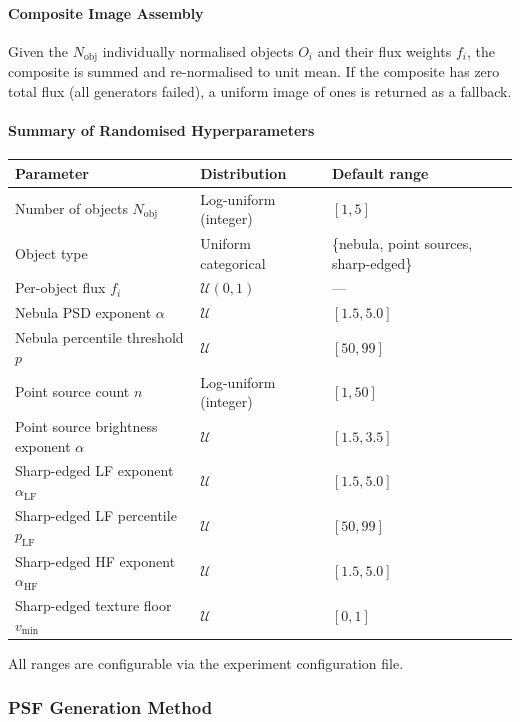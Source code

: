 \documentclass{aa}
\begin{document}
\paragraph{Composite Image Assembly}

Given the $N_\mathrm{obj}$ individually normalised objects $O_i$ and their flux weights $f_i$, the composite is summed and re-normalised to unit mean. If the composite has zero total flux (all generators failed), a uniform image of ones is returned as a fallback.

\paragraph{Summary of Randomised Hyperparameters}

\begin{table}[h]
\centering
\begin{tabular}{|l|l|l|}
\hline
\textbf{Parameter} & \textbf{Distribution} & \textbf{Default range} \\
\hline
Number of objects $N_\mathrm{obj}$ & Log-uniform (integer) & $[1, 5]$ \\
Object type & Uniform categorical & \{nebula, point sources, sharp-edged\} \\
Per-object flux $f_i$ & $\mathcal{U}(0,1)$ & --- \\
Nebula PSD exponent $\alpha$ & $\mathcal{U}$ & $[1.5, 5.0]$ \\
Nebula percentile threshold $p$ & $\mathcal{U}$ & $[50, 99]$ \\
Point source count $n$ & Log-uniform (integer) & $[1, 50]$ \\
Point source brightness exponent $\alpha$ & $\mathcal{U}$ & $[1.5, 3.5]$ \\
Sharp-edged LF exponent $\alpha_\mathrm{LF}$ & $\mathcal{U}$ & $[1.5, 5.0]$ \\
Sharp-edged LF percentile $p_\mathrm{LF}$ & $\mathcal{U}$ & $[50, 99]$ \\
Sharp-edged HF exponent $\alpha_\mathrm{HF}$ & $\mathcal{U}$ & $[1.5, 5.0]$ \\
Sharp-edged texture floor $v_\mathrm{min}$ & $\mathcal{U}$ & $[0, 1]$ \\
\hline
\end{tabular}
\end{table}

All ranges are configurable via the experiment configuration file.

\subsubsection{PSF Generation Method}
\end{document}
